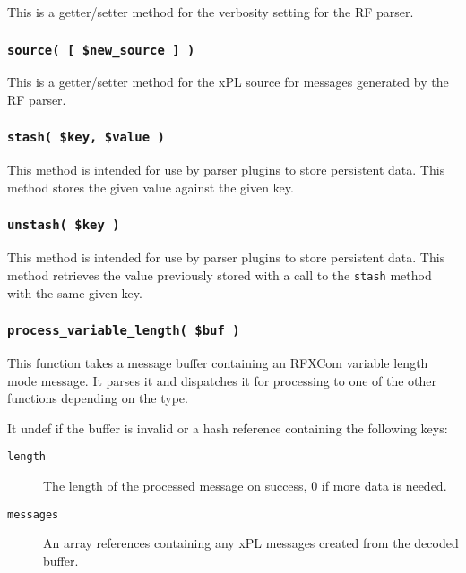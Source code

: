 This is a getter/setter method for the verbosity setting for the RF parser.

\subsubsection*{\texttt{source( [ \$new\_source ] )}\label{xPL::RF_source_new_source_}}


This is a getter/setter method for the xPL source for messages generated
by the RF parser.

\subsubsection*{\texttt{stash( \$key, \$value )}\label{xPL::RF_stash_key_value_}}


This method is intended for use by parser plugins to store
persistent data.  This method stores the given value against
the given key.

\subsubsection*{\texttt{unstash( \$key )}\label{xPL::RF_unstash_key_}}


This method is intended for use by parser plugins to store persistent
data.  This method retrieves the value previously stored with a call
to the \texttt{stash} method with the same given key.

\subsubsection*{\texttt{process\_variable\_length( \$buf )}\label{xPL::RF_process_variable_length_buf_}}


This function takes a message buffer containing an RFXCom variable
length mode message.  It parses it and dispatches it for processing to
one of the other functions depending on the type.



It undef if the buffer is invalid or a hash reference containing the
following keys:

\begin{description}

\item[{\texttt{length}}] \mbox{}

The length of the processed message on success, 0 if more
data is needed.


\item[{\texttt{messages}}] \mbox{}

An array references containing any xPL messages created from the
decoded buffer.

\end{description}
